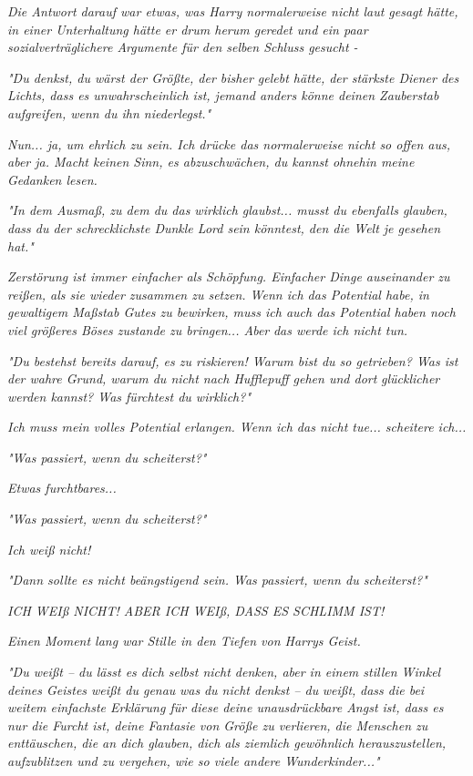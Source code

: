 {\emph{Die Antwort darauf war etwas, was Harry normalerweise nicht laut gesagt hätte, in einer Unterhaltung hätte er drum herum geredet und ein paar sozialverträglichere Argumente für den selben Schluss gesucht -}

\emph{\emph{"Du denkst, du wärst der Größte, der bisher gelebt hätte, der stärkste Diener des Lichts, dass es unwahrscheinlich ist, jemand anders könne deinen Zauberstab aufgreifen, wenn du ihn niederlegst."}}

\emph{Nun... ja, um ehrlich zu sein. Ich drücke das normalerweise nicht so offen aus, aber ja. Macht keinen Sinn, es abzuschwächen, du kannst ohnehin meine Gedanken lesen.}

\emph{"In dem Ausmaß, zu dem du das wirklich glaubst... musst du ebenfalls glauben, dass du der schrecklichste Dunkle Lord sein könntest, den die Welt je gesehen hat."}

\emph{Zerstörung ist immer einfacher als Schöpfung. Einfacher Dinge auseinander zu reißen, als sie wieder zusammen zu setzen. Wenn ich das Potential habe, in gewaltigem Maßstab Gutes zu bewirken, muss ich auch das Potential haben noch viel größeres Böses zustande zu bringen... Aber} \emph{das werde ich nicht tun.}

\emph{"Du bestehst bereits darauf, es zu riskieren! Warum bist du so getrieben? Was ist der wahre Grund, warum du nicht nach Hufflepuff gehen und dort} \emph{glücklicher} \emph{\emph{werden kannst? Was fürchtest du wirklich?}"}

\emph{Ich muss mein volles Potential erlangen. Wenn ich das nicht tue... scheitere ich...}

\emph{"Was passiert, wenn du scheiterst?"}

\emph{Etwas furchtbares...}

\emph{"Was passiert, wenn du scheiterst?"}

\emph{Ich weiß nicht!}

\emph{"Dann sollte es nicht beängstigend sein. Was passiert, wenn du scheiterst?"}

\emph{\emph{ICH WEIß NICHT! ABER ICH WEIß, DASS ES SCHLIMM IST!}}

\emph{Einen Moment lang war Stille in den Tiefen von Harrys Geist.}

\emph{\emph{"Du weißt -- du lässt es dich selbst nicht denken, aber in einem stillen Winkel deines Geistes weißt du genau}} \emph{was} \emph{\emph{du nicht denkst -- du}} \emph{weißt,} \emph{\emph{dass die bei weitem einfachste Erklärung für diese deine unausdrückbare Angst ist, dass es nur die Furcht ist, deine Fantasie von Größe zu verlieren, die Menschen zu enttäuschen, die an dich glauben, dich als ziemlich gewöhnlich herauszustellen, aufzublitzen und zu vergehen, wie so viele andere Wunderkinder..."}}

}
